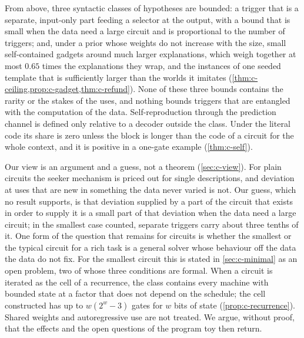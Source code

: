 From above, three syntactic classes of hypotheses are bounded: a trigger that is a separate, input-only part
feeding a selector at the output, with a bound that is small when the data need a large circuit and is
proportional to the number of triggers; and, under a prior whose weights do not increase with the size,
small self-contained gadgets around much larger explanations, which weigh together at most $0.65$ times the
explanations they wrap, and the instances of one seeded template that is sufficiently larger than the worlds
it imitates (\cref{thm:c-ceiling,prop:c-gadget,thm:c-refund}). None of these three bounds
contains the rarity or the stakes of the uses, and nothing bounds triggers that are entangled with the
computation of the data. Self-reproduction through the prediction channel is defined only relative to a
decoder outside the class. Under the literal code its share is zero unless the block is longer than the code
of a circuit for the whole context, and it is positive in a one-gate example (\cref{thm:c-self}).

Our view is an argument and a guess, not a theorem (\cref{sec:c-view}). For plain circuits the seeker
mechanism is priced out for single descriptions, and deviation at uses that are new in something the data
never varied is not. Our guess, which no result supports, is that deviation supplied by a part of the
circuit that exists in order to supply it is a small part of that deviation when the data need a large
circuit; in the smallest case counted, separate triggers carry about three tenths of it. One form of the
question that remains for circuits is whether the smallest or the typical circuit for a rich task is a
general solver whose behaviour off the data the data do not fix. For the smallest circuit this is stated in
\cref{sec:c-minimal} as an open problem, two of whose three conditions are formal. When a
circuit is iterated as the cell of a recurrence, the class contains every machine with bounded state at a
factor that does not depend on the schedule; the cell constructed has up to $w(2^w-3)$ gates for $w$ bits of
state (\cref{prop:c-recurrence}). Shared weights and autoregressive use are not treated. We argue, without
proof, that the effects and the open questions of the program toy then return.

